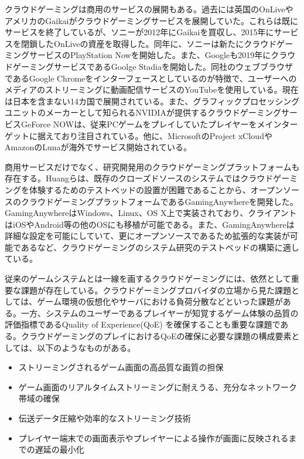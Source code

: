 クラウドゲーミングは商用のサービスの展開もある。過去には英国のOnLive\cite{onlive}やアメリカのGaikaiがクラウドゲーミングサービスを展開していた。これらは既にサービスを終了しているが、ソニーが2012年にGaikaiを買収し、2015年にサービスを閉鎖したOnLiveの資産を取得した\cite{onlive-sony-gaikai}。同年に、ソニーは新たにクラウドゲーミングサービスのPlayStation Now\cite{ps-now}を開始した。また、Googleも2019年にクラウドゲーミングサービスであるGoolge Stadia\cite{stadia}を開始した。同社のウェブブラウザであるGoogle Chromeをインターフェースとしているのが特徴で、ユーザーへのメディアのストリーミングに動画配信サービスのYouTubeを使用している。現在は日本を含まない14カ国で展開されている。また、グラフィックプロセッシングユニットのメーカーとして知られるNVIDIAが提供するクラウドゲーミングサービスGeForce NOW\cite{geforce-now}は、従来PCゲームをプレイしていたプレイヤーをメインターゲットに据えており注目されている。他に、MicrosoftのProject xCloudやAmazonのLunaが海外でサービス開始されている。

商用サービスだけでなく、研究開発用のクラウドゲーミングプラットフォームも存在する。Huangら\cite{gaminganywhere}は、既存のクローズドソースのシステムではクラウドゲーミングを体験するためのテストベッドの設置が困難であることから、オープンソースのクラウドゲーミングプラットフォームであるGamingAnywhereを開発した。GamingAnywhereはWindows、Linux、OS X上で実装されており、クライアントはiOSやAndroid等の他のOSにも移植が可能である。また、GamingAnywhereは詳細な設定を可能にしていて、更にオープンソースであるため拡張的な実装が可能であるなど、クラウドゲーミングのシステム研究のテストベッドの構築に適している。

従来のゲームシステムとは一線を画するクラウドゲーミングには、依然として重要な課題が存在している\cite{cloudgaming-survey}。クラウドゲーミングプロバイダの立場から見た課題としては、ゲーム環境の仮想化やサーバにおける負荷分散などといった課題がある。一方、システムのユーザーであるプレイヤーが知覚するゲーム体験の品質の評価指標であるQuality of Experience(QoE)
を確保することも重要な課題である。クラウドゲーミングのプレイにおけるQoEの確保に必要な課題の構成要素としては、以下のようなものがある。
\begin{itemize}
    \item ストリーミングされるゲーム画面の高品質な画質の担保
    \item ゲーム画面のリアルタイムストリーミングに耐えうる、充分なネットワーク帯域の確保
    \item 伝送データ圧縮や効率的なストリーミング技術
    \item プレイヤー端末での画面表示やプレイヤーによる操作が画面に反映されるまでの遅延の最小化
\end{itemize}

